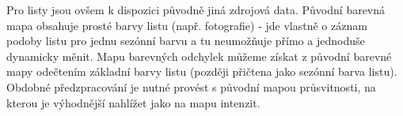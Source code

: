 Pro listy jsou ovšem k dispozici původně jiná zdrojová data. Původní barevná mapa obsahuje prosté barvy listu (např. fotografie) - jde vlastně o záznam podoby listu pro jednu sezónní barvu a tu neumožňuje přímo a jednoduše dynamicky měnit. Mapu barevných odchylek můžeme získat z původní barevné mapy odečtením základní barvy listu (později přičtena jako sezónní barva listu). Obdobné předzpracování je nutné provést s původní mapou průsvitnosti, na kterou je výhodnější nahlížet jako na mapu intenzit.  

\newpage